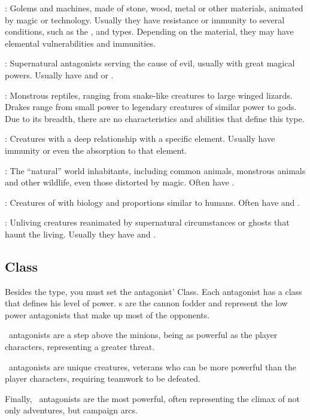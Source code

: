 \begin{multicols}{2}
\tmtypeconstr{}: Golems and machines, made of stone, wood, metal or other materials, animated by magic or technology. Usually they have resistance or immunity to several conditions, such as the ,  and  types. Depending on the material, they may have elemental vulnerabilities and immunities.

\tmtypedemon{}: Supernatural antagonists serving the cause of evil, usually with great magical powers. Usually have  and  or .

\tmtypedrgn{}: Monstrous reptiles, ranging from snake-like creatures to large winged lizards. Drakes range from small power to legendary creatures of similar power to gods. Due to its breadth, there are no characteristics and abilities that define this type.

\tmtypeelem{}: Creatures with a deep relationship with a specific element. Usually have immunity or even the absorption to that element.

\tmtypebeast{}: The “natural” world inhabitants, including common animals, monstrous animals and other wildlife, even those distorted by magic. Often have .

\tmtypehuman{}: Creatures of with biology and proportions similar to humans. Often have  and .

\tmtypeundead{}: Unliving creatures reanimated by supernatural circumstances or ghosts that haunt the living. Usually they have  and .

\subsection{Class}\label{subsec:gm-class}
Besides the type, you must set the antagonist’ Class. Each antagonist has a class that defines his level of power. \tmobmini{}s are the cannon fodder and represent the low power antagonists that make up most of the opponents.

\tmobcomm{}\ antagonists are a step above the minions, being as powerful as the player characters, representing a greater threat.

\tmobleet{}\ antagonists are unique creatures, veterans who can be more powerful than the player characters, requiring teamwork to be defeated.

Finally, \tmobboss{}\ antagonists are the most powerful, often representing the climax of not only adventures, but campaign arcs.


\end{multicols}
